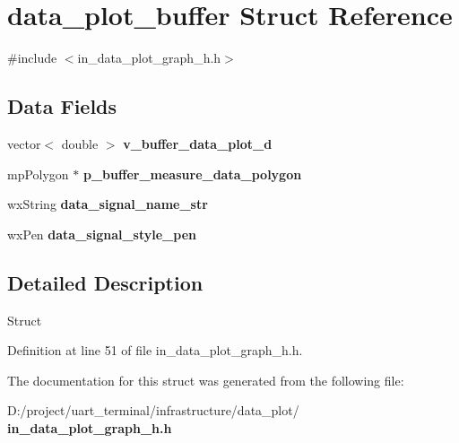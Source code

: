 \section{data\+\_\+plot\+\_\+buffer Struct Reference}
\label{structdata__plot__buffer}


{\ttfamily \#include $<$in\+\_\+data\+\_\+plot\+\_\+graph\+\_\+h.\+h$>$}

\subsection*{Data Fields}
\begin{DoxyCompactItemize}
\item 
vector$<$ double $>$ {\bfseries v\+\_\+buffer\+\_\+data\+\_\+plot\+\_\+d}
\item 
mp\+Polygon $\ast$ {\bfseries p\+\_\+buffer\+\_\+measure\+\_\+data\+\_\+polygon}
\item 
wx\+String {\bfseries data\+\_\+signal\+\_\+name\+\_\+str}
\item 
wx\+Pen {\bfseries data\+\_\+signal\+\_\+style\+\_\+pen}
\end{DoxyCompactItemize}


\subsection{Detailed Description}
Struct 

Definition at line 51 of file in\+\_\+data\+\_\+plot\+\_\+graph\+\_\+h.\+h.



The documentation for this struct was generated from the following file\+:\begin{DoxyCompactItemize}
\item 
D\+:/project/uart\+\_\+terminal/infrastructure/data\+\_\+plot/\textbf{ in\+\_\+data\+\_\+plot\+\_\+graph\+\_\+h.\+h}\end{DoxyCompactItemize}
